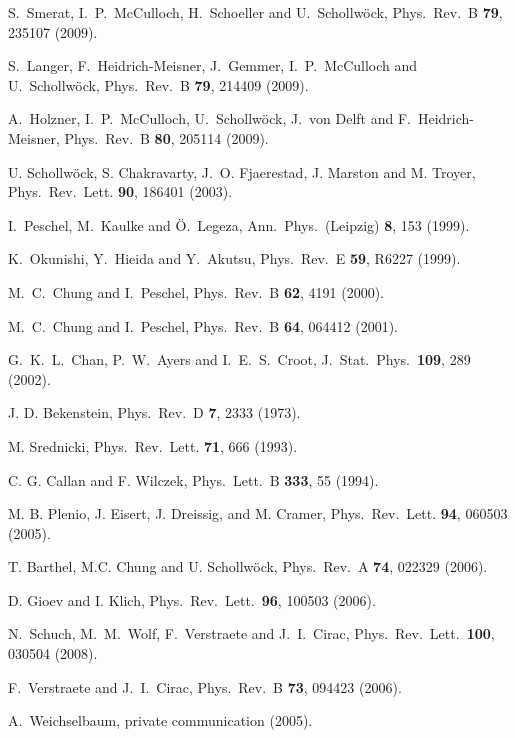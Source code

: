  S.~Smerat, I.~P.~McCulloch, H.~Schoeller and U.~Schollw\"{o}ck,
Phys.\ Rev.\ B {\bf 79}, 235107 (2009).

 S.~Langer, F.~Heidrich-Meisner, J.~Gemmer, I.~P.~McCulloch and U.~Schollw\"{o}ck,
Phys.\ Rev.\ B {\bf 79}, 214409 (2009).

 A.~Holzner, I.~P.~McCulloch,  U.~Schollw\"{o}ck, J.~von Delft and F.~Heidrich-Meisner,
Phys.\ Rev.\ B {\bf 80}, 205114 (2009).

U. Schollw\"{o}ck, S. Chakravarty, J.~O. Fjaerestad, J. Marston and M. Troyer,
Phys.\ Rev.\ Lett. {\bf 90}, 186401 (2003).

I.~Peschel, M.~Kaulke and \"{O}.~Legeza, Ann.\ Phys.\ (Leipzig) {\bf 8}, 153 (1999).

K.~Okunishi, Y.~Hieida and Y.~Akutsu, Phys.\ Rev.\ E {\bf 59}, R6227 (1999).

M.~C.~Chung and I.~Peschel, Phys.\ Rev.\ B {\bf 62}, 4191 (2000).

M.~C.~Chung and I.~Peschel, Phys.\ Rev.\ B {\bf 64}, 064412 (2001).

G.~K.~L.~Chan, P.~W.~Ayers and I.~E.~S.~Croot, J.\ Stat.\ Phys.\ {\bf 109}, 289 (2002). 

J. D. Bekenstein, Phys.\ Rev.\ D {\bf 7}, 2333 (1973).

M. Srednicki, Phys.\ Rev.\ Lett. {\bf 71}, 666 (1993).

C. G. Callan and F. Wilczek, Phys.\ Lett.\ B {\bf 333}, 55 (1994).

M. B. Plenio, J. Eisert, J. Dreissig, and M. Cramer, Phys.\ Rev.\ Lett. {\bf 94}, 
060503 (2005).

T. Barthel, M.C. Chung and U. Schollw\"{o}ck, Phys.\ Rev.\ A {\bf 74}, 022329 (2006).

D. Gioev and I. Klich, Phys.\ Rev.\ Lett.\ {\bf 96}, 100503 (2006).

N.~Schuch, M.~M.~Wolf, F.~Verstraete and J.~I.~Cirac,
Phys.\ Rev.\ Lett.\ {\bf 100}, 030504 (2008).

F.~Verstraete and J.~I.~Cirac, Phys.\ Rev.\ B {\bf 73}, 094423 (2006). 

A.~Weichselbaum, private communication (2005).

